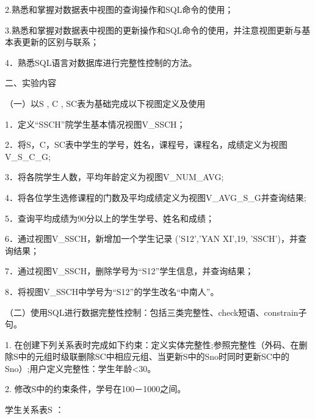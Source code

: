 \documentclass[
]{article}
\begin{document}
2.熟悉和掌握对数据表中视图的查询操作和SQL命令的使用；

3.熟悉和掌握对数据表中视图的更新操作和SQL命令的使用，并注意视图更新与基本表更新的区别与联系；

4．熟悉SQL语言对数据库进行完整性控制的方法。

二、实验内容

（一）以S , C , SC表为基础完成以下视图定义及使用

1．定义``SSCH''院学生基本情况视图V\_SSCH；

2．将S，C，SC表中学生的学号，姓名，课程号，课程名，成绩定义为视图V\_S\_C\_G;

3．将各院学生人数，平均年龄定义为视图V\_NUM\_AVG;

4．将各位学生选修课程的门数及平均成绩定义为视图V\_AVG\_S\_G并查询结果;

5．查询平均成绩为90分以上的学生学号、姓名和成绩；

6．通过视图V\_SSCH，新增加一个学生记录 ('S12','YAN XI',19,
'SSCH')，并查询结果；

7．通过视图V\_SSCH，删除学号为``S12''学生信息，并查询结果；

8．将视图V\_SSCH中学号为``S12''的学生改名``中南人''。

（二）使用SQL进行数据完整性控制：包括三类完整性、check短语、constrain子句。

1.
在创建下列关系表时完成如下约束：定义实体完整性;参照完整性（外码、在删除S中的元组时级联删除SC中相应元组、当更新S中的Sno时同时更新SC中的Sno）;用户定义完整性：学生年龄\textless30。

2. 修改S中的约束条件，学号在100－1000之间。

学生关系表S ：
\end{document}
